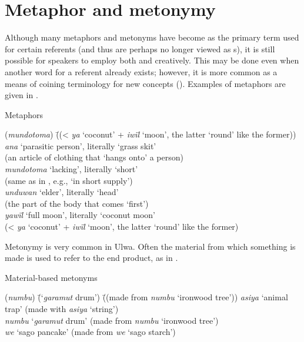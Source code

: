 
\section{Metaphor and metonymy}\label{sec:14.2}


Although many metaphors and metonyms have become  as the primary term used for certain referents (and thus are perhaps no longer viewed as s), it is still possible for speakers to employ both  and  creatively. This may be done even when another word for a referent already exists; however, it is more common as a means of coining terminology for new concepts (). Examples of metaphors are given in .

\ea%
    \label{ex:sem:6}
            Metaphors\\
\begin{tabbing}
{(\textit{mundotoma})} \= {((< \textit{ya} ‘coconut’ + \textit{iwïl} ‘moon’, the latter ‘round’ like the former))}\kill
{\textit{ana}} \> {‘parasitic person’, literally ‘grass skit’}\\
{ } \> {(an article of clothing that ‘hangs onto’ a person)}\\
{\textit{mundotoma}} \> {‘lacking’, literally ‘short’}\\
{ } \> {(same  as in , e.g., ‘in short supply’)}\\
{\textit{unduwan}} \> {‘elder’, literally ‘head’}\\
{ } \> {(the part of the body that comes ‘first’)}\\
{\textit{yawïl}} \> {‘full moon’, literally ‘coconut moon’}\\
{ } \> {(< \textit{ya} ‘coconut’ + \textit{iwïl} ‘moon’, the latter ‘round’ like the former)}
\end{tabbing}
\z

Metonymy is very common in Ulwa. Often the material from which something is made is used to refer to the end product, as in .

\newpage

\ea%
    \label{ex:sem:7}
            Material-based metonyms
\begin{tabbing}
{(\textit{numbu})} \= {(‘\textit{garamut} drum’)} \= {((made from \textit{numbu} ‘ironwood tree’))}\kill
\textit{asiya} \> {‘animal trap’}  \> {(made with \textit{asiya} ‘string’)}\\
\textit{numbu} \> {‘\textit{garamut} drum’} \> {(made from \textit{numbu} ‘ironwood tree’)}\\
\textit{we} \> {‘sago pancake’} \> {(made from \textit{we} ‘sago starch’)}
\end{tabbing}
  \z

